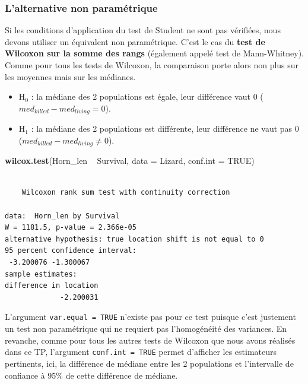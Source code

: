 \documentclass[a4paperpaper,]{article}
\newenvironment{Shaded}{\begin{snugshade}}{\end{snugshade}}
\newcommand{\DataTypeTok}[1]{\textcolor[rgb]{0.00,0.34,0.68}{#1}}
\newcommand{\KeywordTok}[1]{\textcolor[rgb]{0.12,0.11,0.11}{\textbf{#1}}}
\newcommand{\NormalTok}[1]{\textcolor[rgb]{0.12,0.11,0.11}{#1}}
\newcommand{\OperatorTok}[1]{\textcolor[rgb]{0.12,0.11,0.11}{#1}}
\newcommand{\OtherTok}[1]{\textcolor[rgb]{0.00,0.43,0.16}{#1}}
\newcommand{\StringTok}[1]{\textcolor[rgb]{0.75,0.01,0.01}{#1}}
\providecommand{\tightlist}{%
  \setlength{\itemsep}{0pt}\setlength{\parskip}{0pt}}
\begin{document}
\hypertarget{lalternative-non-paramuxe9trique-2}{%
\subsubsection{L'alternative non paramétrique}\label{lalternative-non-paramuxe9trique-2}}

Si les conditions d'application du test de Student ne sont pas vérifiées, nous devons utiliser un équivalent non paramétrique. C'est le cas du \textbf{test de Wilcoxon sur la somme des rangs} (également appelé test de Mann-Whitney). Comme pour tous les tests de Wilcoxon, la comparaison porte alors non plus sur les moyennes mais sur les médianes.

\begin{itemize}
\tightlist
\item
  H\(_0\) : la médiane des 2 populations est égale, leur différence vaut 0 (\(med_{killed}-med_{living} = 0\)).
\item
  H\(_1\) : la médiane des 2 populations est différente, leur différence ne vaut pas 0 (\(med_{killed}-med_{living}\neq 0\)).
\end{itemize}

\begin{Shaded}
\begin{Highlighting}[]
\KeywordTok{wilcox.test}\NormalTok{(Horn_len }\OperatorTok{~}\StringTok{ }\NormalTok{Survival, }\DataTypeTok{data =}\NormalTok{ Lizard, }\DataTypeTok{conf.int =} \OtherTok{TRUE}\NormalTok{)}
\end{Highlighting}
\end{Shaded}

\begin{verbatim}

    Wilcoxon rank sum test with continuity correction

data:  Horn_len by Survival
W = 1181.5, p-value = 2.366e-05
alternative hypothesis: true location shift is not equal to 0
95 percent confidence interval:
 -3.200076 -1.300067
sample estimates:
difference in location 
             -2.200031 
\end{verbatim}

L'argument \texttt{var.equal\ =\ TRUE} n'existe pas pour ce test puisque c'est justement un test non paramétrique qui ne requiert pas l'homogénéité des variances. En revanche, comme pour tous les autres tests de Wilcoxon que nous avons réalisés dans ce TP, l'argument \texttt{conf.int\ =\ TRUE} permet d'afficher les estimateurs pertinents, ici, la différence de médiane entre les 2 populations et l'intervalle de confiance à 95\% de cette différence de médiane.
\end{document}
